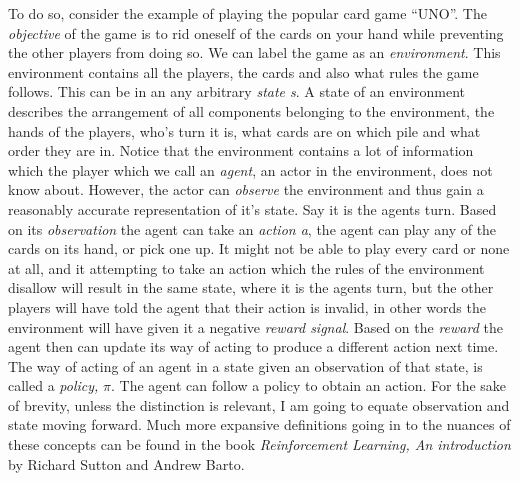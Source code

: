 \noindent
To do so, consider the example of playing the popular card game “UNO”. The \textit{objective} of the game is to rid oneself of the cards on your hand while preventing the other players from doing so. We can label the game as an \textit{environment}. This environment contains all the players, the cards and also what rules the game follows. This  can be in an any arbitrary \textit{state s}. A state of an environment describes the arrangement of all components belonging to the environment, the hands of the players, who's turn it is, what cards are on which pile and what order they are in. Notice that the environment contains a lot of information which the player which we call an \textit{agent}, an actor in the environment, does not know about. However, the actor can \textit{observe} the environment and thus gain a reasonably accurate representation of it’s state. Say it is the agents turn. Based on its \textit{observation} the agent can take an \textit{action a}, the agent can play any of the cards on its hand, or pick one up. It might not be able to play every card or none at all, and it attempting to take an action which the rules of the environment disallow will result in the same state, where it is the agents turn, but the other players will have told the agent that their action is invalid, in other words the environment will have given it a negative \textit{reward signal}. Based on the \textit{reward} the agent then can update its way of acting to produce a different action next time. The way of acting of an agent in a state given an observation of that state, is called a \textit{policy, } $\pi$. The agent can follow a policy to obtain an action.
\newline
For the sake of brevity, unless the distinction is relevant, I am going to equate observation and state moving forward. Much more expansive definitions going in to the nuances of these concepts can be found in the book \textit{Reinforcement Learning, An introduction} by Richard Sutton and Andrew Barto. \cite{sutton_reinforcement_2018}

